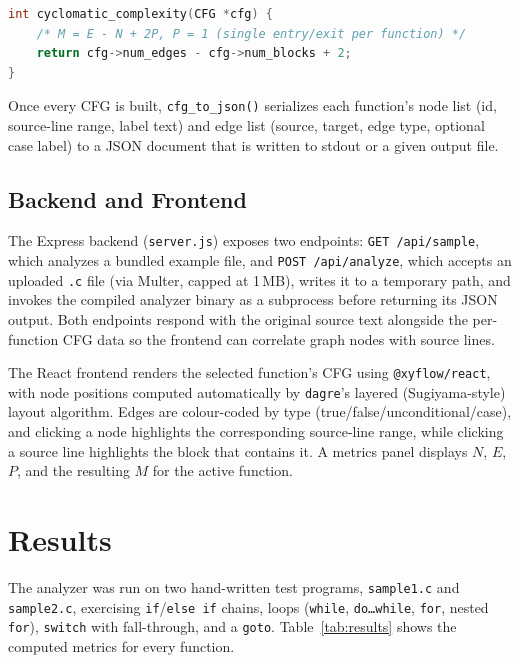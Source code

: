 \documentclass[11pt]{article}
\begin{document}
\begin{lstlisting}[language=C, caption={Cyclomatic complexity computation (\texttt{cfg.c})}, label={lst:mccabe}]
int cyclomatic_complexity(CFG *cfg) {
    /* M = E - N + 2P, P = 1 (single entry/exit per function) */
    return cfg->num_edges - cfg->num_blocks + 2;
}
\end{lstlisting}

Once every CFG is built, \texttt{cfg\_to\_json()} serializes each function's node list (id, source-line range, label text) and edge list (source, target, edge type, optional case label) to a JSON document that is written to stdout or a given output file.

\subsection{Backend and Frontend}
The Express backend (\texttt{server.js}) exposes two endpoints: \texttt{GET /api/sample}, which analyzes a bundled example file, and \texttt{POST /api/analyze}, which accepts an uploaded \texttt{.c} file (via Multer, capped at 1\,MB), writes it to a temporary path, and invokes the compiled analyzer binary as a subprocess before returning its JSON output. Both endpoints respond with the original source text alongside the per-function CFG data so the frontend can correlate graph nodes with source lines.

The React frontend renders the selected function's CFG using \texttt{@xyflow/react}, with node positions computed automatically by \texttt{dagre}'s layered (Sugiyama-style) layout algorithm. Edges are colour-coded by type (true/false/unconditional/case), and clicking a node highlights the corresponding source-line range, while clicking a source line highlights the block that contains it. A metrics panel displays $N$, $E$, $P$, and the resulting $M$ for the active function.

\section{Results}
The analyzer was run on two hand-written test programs, \texttt{sample1.c} and \texttt{sample2.c}, exercising \texttt{if}/\texttt{else if} chains, loops (\texttt{while}, \texttt{do\ldots while}, \texttt{for}, nested \texttt{for}), \texttt{switch} with fall-through, and a \texttt{goto}. Table~\ref{tab:results} shows the computed metrics for every function.
\end{document}

